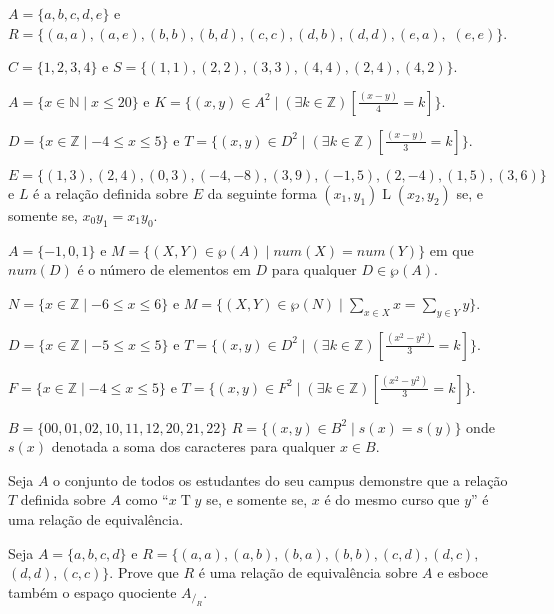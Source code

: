 \begin{exerList}
	\item $A = \{a,b,c,d,e \}$ e $R =\{(a,a),(a,e),(b,b),(b,d),(c,c),(d,b),(d,d), (e, a),$ $(e, e)\}$.
	\item $C = \{1, 2, 3, 4\}$ e $S = \{(1, 1), (2, 2), (3, 3), (4, 4), (2, 4), (4, 2)\}$.
	\item $A = \{x \in \mathbb{N} \mid x \leq 20\}$ e $K = \{(x, y) \in A^2 \mid (\exists k \in \mathbb{Z})[\displaystyle\frac{(x - y)}{4} = k]\}$.
	\item $D = \{x \in \mathbb{Z} \mid -4 \leq x \leq 5\}$ e $T = \{(x, y) \in D^2 \mid (\exists k \in \mathbb{Z})[\displaystyle\frac{(x - y)}{3} = k]\}$.
	\item $E = \{(1, 3), (2,4), (0, 3), (-4, -8), (3, 9), (-1, 5), (2, -4), (1, 5), (3, 6)\}$ e $L$ é a relação definida sobre $E$ da seguinte forma $(x_1, y_1) \mathrel{L} (x_2, y_2)$ se, e somente se, $x_0y_1 = x_1y_0$.
	\item $A = \{-1, 0, 1\}$ e $M = \{(X, Y) \in \wp(A) \mid num(X) = num(Y)\}$ em que $num(D)$ é o número de elementos em $D$ para qualquer $D \in \wp(A)$.
	\item $N = \{x \in \mathbb{Z}\mid -6\leq x \leq 6 \}$ e $M = \Big\{(X, Y) \in \wp(N) \mid \displaystyle\sum_{x \in X} x = \displaystyle\sum_{y \in Y} y\Big\}$.
	\item $D = \{x \in \mathbb{Z} \mid -5 \leq x \leq 5\}$ e $T = \{(x, y) \in D^2 \mid (\exists k \in \mathbb{Z})[\displaystyle\frac{(x^2 - y^2)}{3} = k]\}$.
	\item $F = \{x \in \mathbb{Z} \mid -4 \leq x \leq 5\}$ e $T = \{(x, y) \in F^2 \mid (\exists k \in \mathbb{Z})[\displaystyle\frac{(x^2 - y^2)}{3} = k]\}$.
	\item $B = \{00, 01, 02, 10, 11, 12, 20, 21, 22\}$ $R = \{(x, y) \in B^2 \mid  s(x) = s(y)\}$ onde $s(x)$ denotada a soma dos caracteres para qualquer $x \in B$.
\end{exerList}

\begin{questao}\label{test:EquivalenciaOrdem4}
	Seja $A$ o conjunto de todos os estudantes do seu campus demonstre que a relação $T$ definida sobre $A$ como ``$x \mathrel{T} y$ se, e somente se, $x$ é do mesmo curso que $y$'' é uma relação de equivalência.
\end{questao}

\begin{questao}\label{test:EquivalenciaOrdem5}
	Seja $A = \{a, b, c, d\}$ e $R = \{(a, a), (a, b), (b, a), (b, b), (c, d), (d, c),$ $(d,d), (c, c)\}$. Prove que $R$ é uma relação de equivalência sobre $A$ e esboce também o espaço quociente $A_{/_R}$.
\end{questao}

